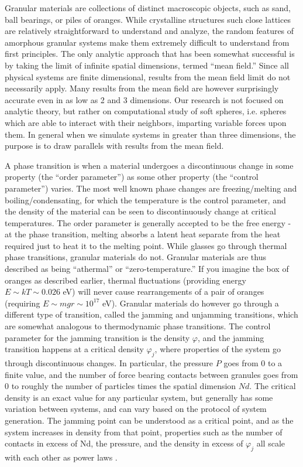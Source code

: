 Granular materials are collections of distinct macroscopic objects, such as sand, ball bearings, or piles of oranges. While crystalline structures such close lattices are relatively straightforward to understand and analyze, the random features of amorphous granular systems make them extremely difficult to understand from first principles. The only analytic approach that has been somewhat successful is by taking the limit of infinite spatial dimensions, termed ``mean field.'' Since all physical systems are finite dimensional, results from the mean field limit do not necessarily apply. Many results from the mean field are however surprisingly accurate even in as low as 2 and 3 dimensions. Our research is not focused on analytic theory, but rather on computational study of soft spheres, i.e. spheres which are able to interact with their neighbors, imparting variable forces upon them. %
In general when we simulate systems in greater than three dimensions, the purpose is to draw parallels with results from the mean field.


A phase transition is when a material undergoes a discontinuous change in some property (the ``order parameter'') as some other property (the ``control parameter'') varies. The most well known phase changes are freezing/melting and boiling/condensating, for which the temperature is the control parameter, and the density of the material can be seen to discontinuously change at critical temperatures. The order parameter is generally accepted to be the free energy - at the phase transition, melting absorbs a latent heat separate from the heat required just to heat it to the melting point. While glasses go through thermal phase transitions, granular materials do not. Granular materials are thus described as being ``athermal'' or ``zero-temperature.'' If you imagine the box of oranges as described earlier, thermal fluctuations (providing energy $E \sim kT \sim 0.026$ eV) will never cause rearrangements of a pair of oranges (requiring $E \sim mgr \sim 10^{17}$ eV). Granular materials do however go through a different type of transition, called the jamming and unjamming transitions, which are somewhat analogous to thermodynamic phase transitions. The control parameter for the jamming transition is the density $\varphi$, and the jamming transition happens at a critical density $\varphi_j$, where properties of the system go through discontinuous changes. In particular, the pressure $P$ goes from 0 to a finite value, and the number of force bearing contacts between granules goes from 0 to roughly the number of particles times the spatial dimension $Nd$. The critical density is an exact value for any particular system, but generally has some variation between systems, and can vary based on the protocol of system generation. The jamming point can be understood as a critical point, and as the system increases in density from that point, properties such as the number of contacts in excess of Nd, the pressure, and the density in excess of $\varphi_j$ all scale with each other as power laws \cite{ohern_jamming_2003,goodrich_scaling_2016}.

